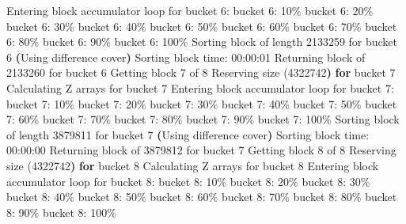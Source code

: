 \documentclass[
  letterpaper,
  DIV=11,
  numbers=noendperiod]{scrartcl}
\newenvironment{Shaded}{\begin{snugshade}}{\end{snugshade}}
\newcommand{\ControlFlowTok}[1]{\textcolor[rgb]{0.00,0.23,0.31}{\textbf{#1}}}
\newcommand{\ErrorTok}[1]{\textcolor[rgb]{0.68,0.00,0.00}{#1}}
\newcommand{\ExtensionTok}[1]{\textcolor[rgb]{0.00,0.23,0.31}{#1}}
\newcommand{\KeywordTok}[1]{\textcolor[rgb]{0.00,0.23,0.31}{\textbf{#1}}}
\newcommand{\NormalTok}[1]{\textcolor[rgb]{0.00,0.23,0.31}{#1}}
\begin{document}
\begin{Shaded}
\begin{Highlighting}[]
  \ExtensionTok{Entering}\NormalTok{ block accumulator loop for bucket 6:}
  \ExtensionTok{bucket}\NormalTok{ 6: 10\%}
  \ExtensionTok{bucket}\NormalTok{ 6: 20\%}
  \ExtensionTok{bucket}\NormalTok{ 6: 30\%}
  \ExtensionTok{bucket}\NormalTok{ 6: 40\%}
  \ExtensionTok{bucket}\NormalTok{ 6: 50\%}
  \ExtensionTok{bucket}\NormalTok{ 6: 60\%}
  \ExtensionTok{bucket}\NormalTok{ 6: 70\%}
  \ExtensionTok{bucket}\NormalTok{ 6: 80\%}
  \ExtensionTok{bucket}\NormalTok{ 6: 90\%}
  \ExtensionTok{bucket}\NormalTok{ 6: 100\%}
  \ExtensionTok{Sorting}\NormalTok{ block of length 2133259 for bucket 6}
  \KeywordTok{(}\ExtensionTok{Using}\NormalTok{ difference cover}\KeywordTok{)}
  \ExtensionTok{Sorting}\NormalTok{ block time: 00:00:01}
\ExtensionTok{Returning}\NormalTok{ block of 2133260 for bucket 6}
\ExtensionTok{Getting}\NormalTok{ block 7 of 8}
  \ExtensionTok{Reserving}\NormalTok{ size }\ErrorTok{(}\ExtensionTok{4322742}\KeywordTok{)} \ControlFlowTok{for}\NormalTok{ bucket }\ExtensionTok{7}
  \ExtensionTok{Calculating}\NormalTok{ Z arrays for bucket 7}
  \ExtensionTok{Entering}\NormalTok{ block accumulator loop for bucket 7:}
  \ExtensionTok{bucket}\NormalTok{ 7: 10\%}
  \ExtensionTok{bucket}\NormalTok{ 7: 20\%}
  \ExtensionTok{bucket}\NormalTok{ 7: 30\%}
  \ExtensionTok{bucket}\NormalTok{ 7: 40\%}
  \ExtensionTok{bucket}\NormalTok{ 7: 50\%}
  \ExtensionTok{bucket}\NormalTok{ 7: 60\%}
  \ExtensionTok{bucket}\NormalTok{ 7: 70\%}
  \ExtensionTok{bucket}\NormalTok{ 7: 80\%}
  \ExtensionTok{bucket}\NormalTok{ 7: 90\%}
  \ExtensionTok{bucket}\NormalTok{ 7: 100\%}
  \ExtensionTok{Sorting}\NormalTok{ block of length 3879811 for bucket 7}
  \KeywordTok{(}\ExtensionTok{Using}\NormalTok{ difference cover}\KeywordTok{)}
  \ExtensionTok{Sorting}\NormalTok{ block time: 00:00:00}
\ExtensionTok{Returning}\NormalTok{ block of 3879812 for bucket 7}
\ExtensionTok{Getting}\NormalTok{ block 8 of 8}
  \ExtensionTok{Reserving}\NormalTok{ size }\ErrorTok{(}\ExtensionTok{4322742}\KeywordTok{)} \ControlFlowTok{for}\NormalTok{ bucket }\ExtensionTok{8}
  \ExtensionTok{Calculating}\NormalTok{ Z arrays for bucket 8}
  \ExtensionTok{Entering}\NormalTok{ block accumulator loop for bucket 8:}
  \ExtensionTok{bucket}\NormalTok{ 8: 10\%}
  \ExtensionTok{bucket}\NormalTok{ 8: 20\%}
  \ExtensionTok{bucket}\NormalTok{ 8: 30\%}
  \ExtensionTok{bucket}\NormalTok{ 8: 40\%}
  \ExtensionTok{bucket}\NormalTok{ 8: 50\%}
  \ExtensionTok{bucket}\NormalTok{ 8: 60\%}
  \ExtensionTok{bucket}\NormalTok{ 8: 70\%}
  \ExtensionTok{bucket}\NormalTok{ 8: 80\%}
  \ExtensionTok{bucket}\NormalTok{ 8: 90\%}
  \ExtensionTok{bucket}\NormalTok{ 8: 100\%}

\end{Highlighting}
\end{Shaded}
\end{document}
